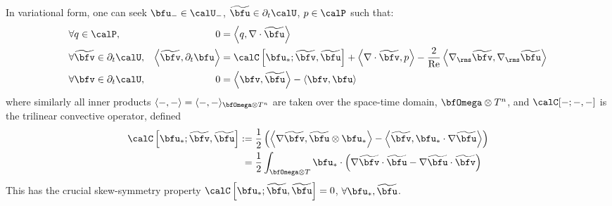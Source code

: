     In variational form, one can seek $\bfu_{-} \in \calU_{-}$, $\widetilde{\bfu} \in \partial_{t}\calU$, $p \in \calP$ such that:
    \begin{align}
        &\forall                 q  \in  \calP,              &                                                            0  &=  \left\langle q, \nabla\cdot\widetilde{\bfu}\right\rangle  \\
        &\forall  \widetilde{\bfv}  \in  \partial_{t}\calU,  &  \left\langle\widetilde{\bfv}, \partial_{t}\bfu\right\rangle  &=  \calC\left[\bfu_{*}; \widetilde{\bfv}, \widetilde{\bfu}\right] + \left\langle\nabla\cdot\widetilde{\bfv}, p\right\rangle - \frac{2}{\rmRe}\left\langle\nabla_{\rms}\widetilde{\bfv}, \nabla_{\rms}\widetilde{\bfu}\right\rangle  \\
        &\forall              \bfv  \in  \partial_{t}\calU,  &                                                            0  &=  \left\langle\bfv, \widetilde{\bfu}\right\rangle - \left\langle\bfv, \bfu\right\rangle
    \end{align}
    where similarly all inner products $\langle -, -\rangle  =  \langle -, -\rangle_{\bfOmega\otimes T^{n}}$ are taken over the space-time domain, $\bfOmega\otimes T^{n}$, and $\calC[-; -, -]$ is the trilinear convective operator, defined
    \begin{align}
        \calC\left[\bfu_{*}; \widetilde{\bfv}, \widetilde{\bfu}\right]  :=  &\;\frac{1}{2}\left(\left\langle\nabla\widetilde{\bfv}, \widetilde{\bfu}\otimes\bfu_{*}\right\rangle - \left\langle\widetilde{\bfv}, \bfu_{*}\cdot\nabla\widetilde{\bfu}\right\rangle\right)  \label{eqn:convective operator definition}  \\
                                                                         =  &\;\frac{1}{2}\int_{\bfOmega\otimes T}\bfu_{*}\cdot\left(\nabla\widetilde{\bfv}\cdot\widetilde{\bfu} - \nabla\widetilde{\bfu}\cdot\widetilde{\bfv}\right)
    \end{align}
    This has the crucial skew-symmetry property $\calC\left[\bfu_{*}; \widetilde{\bfu}, \widetilde{\bfu}\right]  =  0$, $\forall \bfu_{*}, \widetilde{\bfu}$.

    \begin{remark}
    \end{remark}

